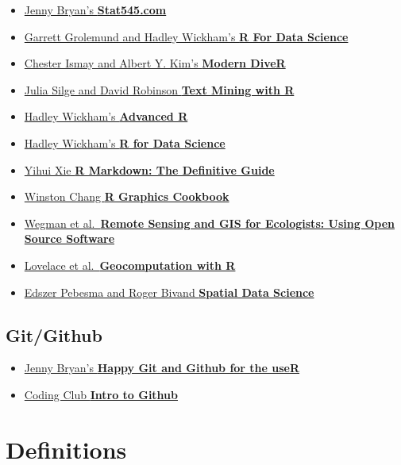 \documentclass[
]{book}
\providecommand{\tightlist}{%
  \setlength{\itemsep}{0pt}\setlength{\parskip}{0pt}}
\begin{document}
\begin{itemize}
\tightlist
\item
  \href{http://stat545.com/}{Jenny Bryan's \textbf{Stat545.com}}
\item
  \href{http://r4ds.had.co.nz/}{Garrett Grolemund and Hadley Wickham's \textbf{R For Data Science}}
\item
  \href{https://ismayc.github.io/moderndiver-book/}{Chester Ismay and Albert Y. Kim's \textbf{Modern DiveR}}
\item
  \href{http://tidytextmining.com/}{Julia Silge and David Robinson \textbf{Text Mining with R}}
\item
  \href{http://adv-r.had.co.nz/}{Hadley Wickham's \textbf{Advanced R}}
\item
  \href{https://r4ds.had.co.nz}{Hadley Wickham's \textbf{R for Data Science}}
\item
  \href{https://bookdown.org/yihui/rmarkdown/}{Yihui Xie \textbf{R Markdown: The Definitive Guide}}
\item
  \href{http://www.cookbook-r.com/}{Winston Chang \textbf{R Graphics Cookbook}}
\item
  \href{http://book.ecosens.org/RSEbook/}{Wegman et al.~\textbf{Remote Sensing and GIS for Ecologists: Using Open Source Software}}
\item
  \href{https://geocompr.robinlovelace.net/}{Lovelace et al.~\textbf{Geocomputation with R}}
\item
  \href{https://keen-swartz-3146c4.netlify.app/index.html}{Edszer Pebesma and Roger Bivand \textbf{Spatial Data Science}}
\end{itemize}

\subsection{Git/Github}\label{gitgithub}

\begin{itemize}
\tightlist
\item
  \href{http://happygitwithr.com/}{Jenny Bryan's \textbf{Happy Git and Github for the useR}}
\item
  \href{https://ourcodingclub.github.io/2017/02/27/git.html}{Coding Club \textbf{Intro to Github}}
\end{itemize}

\section{Definitions}\label{definitions}
\end{document}
